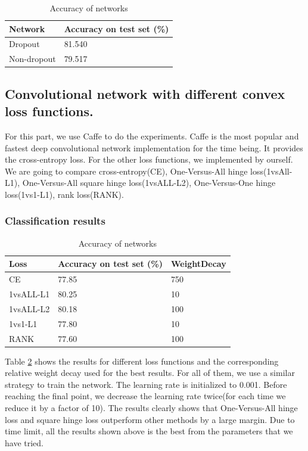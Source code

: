 \documentclass{article} %
\begin{document}
\begin{table}
\centering 
    \begin{tabular}{l|l}
    \hline
    Network     & Accuracy on test set (\%) \\ \hline
    Dropout     & 81.540                 \\ \hline
    Non-dropout & 79.517                 \\ \hline
    \end{tabular}
     \caption{Accuracy of networks}   
     \label{table1}
\end{table}

\subsection{Convolutional network with different convex loss functions.}
For this part, we use Caffe to do the experiments. Caffe is the most popular and fastest deep convolutional network implementation for the time being. It provides the cross-entropy loss. For the other loss functions, we implemented by ourself. We are going to compare cross-entropy(CE), One-Versus-All hinge loss(1vsAll-L1), One-Versus-All square hinge loss(1vsALL-L2), One-Versus-One hinge loss(1vs1-L1), rank loss(RANK).
\subsubsection{Classification results}
\begin{table}
\centering 
    \begin{tabular}{l|l|l}
    \hline
    Loss     & Accuracy on test set (\%) & WeightDecay\\ \hline
    CE     & 77.85  &      750         \\ \hline
    1vsALL-L1 & 80.25  &   10            \\ \hline
    1vsALL-L2 &  80.18       &    100         \\ \hline
    1vs1-L1 &   77.80       &     10         \\ \hline
    RANK    &   77.60       &    100          \\ \hline
    \end{tabular}
     \caption{Accuracy of networks}   
     \label{table2}
\end{table}
Table \ref{table2} shows the results for different loss functions and the corresponding relative weight decay used for the best results. For all of them, we use a similar strategy to train the network. The learning rate is initialized to 0.001. Before reaching the final point, we decrease the learning rate twice(for each time we reduce it by a factor of 10). The results clearly shows that One-Versus-All hinge loss and square hinge loss outperform other methods by a large margin. Due to time limit, all the results shown above is the best from the parameters that we have
tried. 
\end{document}
